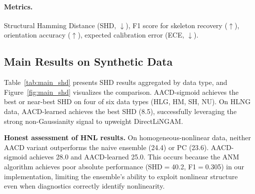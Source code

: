 \documentclass{article}
\newcommand{\aacd}{\textsc{AACD}}
\begin{document}
\paragraph{Metrics.} Structural Hamming Distance (SHD, $\downarrow$), F1 score for skeleton recovery ($\uparrow$), orientation accuracy ($\uparrow$), expected calibration error (ECE, $\downarrow$).

\subsection{Main Results on Synthetic Data}

Table~\ref{tab:main_shd} presents SHD results aggregated by data type, and Figure~\ref{fig:main_shd} visualizes the comparison. \aacd{}-sigmoid achieves the best or near-best SHD on four of six data types (HLG, HM, SH, NU). On HLNG data, \aacd{}-learned achieves the best SHD (8.5), successfully leveraging the strong non-Gaussianity signal to upweight DirectLiNGAM.

\textbf{Honest assessment of HNL results.} On homogeneous-nonlinear data, neither \aacd{} variant outperforms the naive ensemble (24.4) or PC (23.6). \aacd{}-sigmoid achieves 28.0 and \aacd{}-learned 25.0. This occurs because the ANM algorithm achieves poor absolute performance (SHD$=$40.2, F1$=$0.305) in our implementation, limiting the ensemble's ability to exploit nonlinear structure even when diagnostics correctly identify nonlinearity.
\end{document}
